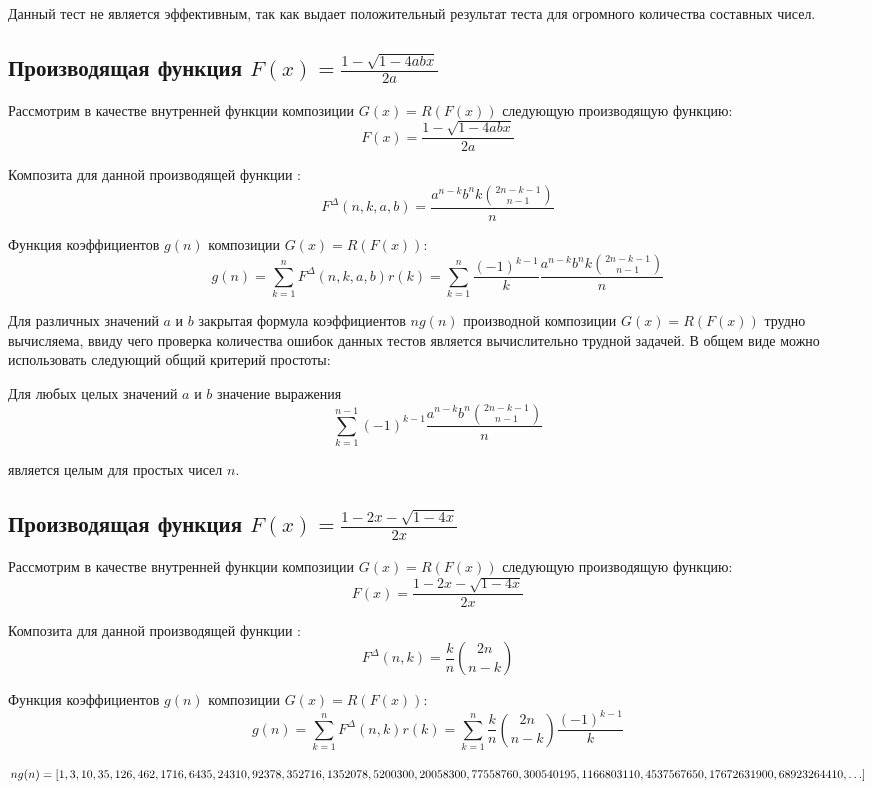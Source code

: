 \documentclass[
russian,
cp1251,
14pt,
simple
]{eskdtext}
\theoremstyle{definition}
\begin{document}
Данный тест не является эффективным, так как выдает положительный результат теста для огромного количества составных чисел.

\subsection{Производящая функция $F(x)=\frac{1-\sqrt{1-4abx}}{2a}$}
Рассмотрим в качестве внутренней функции композиции $G(x)=R(F(x))$ следующую производящую функцию:
$$
F(x)=\frac{1-\sqrt{1-4abx}}{2a}
$$

Композита для данной производящей функции \cite{KruchininVV}:
$$
F^\Delta(n,k,a,b)=\frac{a^{n-k}b^nk{2n-k-1 \choose n-1}}{n}
$$

Функция коэффициентов $g(n)$ композиции $G(x)=R(F(x))$:
$$
g(n)=\sum\limits _{k=1}^{n}{F^\Delta(n,k,a,b)r(k)}=\sum\limits _{k=1}^{n}\frac{(-1)^{k-1}}{k} 
\frac{a^{n-k}b^nk{2n-k-1 \choose n-1}}{n}
$$

Для различных значений $a$ и $b$ закрытая формула коэффициентов $ng(n)$ производной композиции $G(x)=R(F(x))$ трудно вычисляема, ввиду чего проверка количества ошибок данных тестов является вычислительно трудной задачей. В общем виде можно использовать следующий общий критерий простоты:

Для любых целых значений $a$ и $b$ значение выражения
$$
\sum\limits _{k=1}^{n-1} (-1)^{k-1} 
\frac{a^{n-k}b^n{2n-k-1 \choose n-1}}{n}
$$

является целым для простых чисел $n$.

\subsection{Производящая функция $F(x)=\frac{1-2x-\sqrt{1-4x}}{2x}$}
Рассмотрим в качестве внутренней функции композиции $G(x)=R(F(x))$ следующую производящую функцию:
$$
F(x)=\frac{1-2x-\sqrt{1-4x}}{2x}
$$

Композита для данной производящей функции \cite{KruchininVV}:
$$
F^\Delta(n,k)=\frac{k}{n} {2n \choose n-k}
$$

Функция коэффициентов $g(n)$ композиции $G(x)=R(F(x))$:
$$
g(n)=\sum^{n}_{k=1}{F^\Delta(n,k)r(k)}=\sum^{n}_{k=1}{\frac{k}{n} {2n \choose n-k} \frac{(-1)^{k-1}}{k}}
$$

\begin{math}
ng(n)=[1,3,10,35,126,462,1716,6435,24310,92378,352716,1352078,\\
5200300,20058300,77558760,300540195,1166803110,4537567650,17672631900,\\
68923264410,\ldots]
\end{math}
\end{document}
